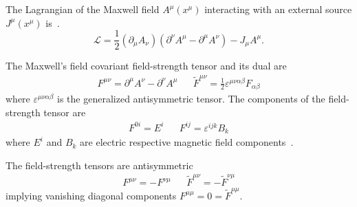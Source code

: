\begin{definition}
	The Lagrangian of the Maxwell field $A^\mu(x^\mu)$ interacting with an external source $J^\mu(x^\mu)$ is~\cite[p.~339]{Srednicki2007}.
	\begin{equation}
		\mathcal{L}
		=
		\frac{1}{2}
		(\partial_\mu A_\nu)
		\left(
			\partial^\nu A^\mu
			-
			\partial^\mu A^\nu
		\right)
		-
		J_\mu A^\mu
		\label{eq:mw_lagrangian}
		.
	\end{equation}
\end{definition}
\begin{definition}
	The Maxwell's field covariant field-strength tensor and its dual are
	\begin{align}
		F^{\mu\nu}
		=
		\partial^\mu A^\nu
		-
		\partial^\nu A^\mu
		&&
		\tilde{F}^{\mu\nu}
		=
		\frac{1}{2}
		\varepsilon^{\mu\nu\alpha\beta}
		F_{\alpha\beta}
		\label{eq:mw_field_strength_tensors}
	\end{align}
	where $\varepsilon^{\mu\nu\alpha\beta}$ is the generalized antisymmetric tensor.
	The components of the field-strength tensor are
	\begin{align}
		F^{0i}
		=
		E^i
		&&
		F^{ij}
		=
		\varepsilon^{ijk}B_k
		\label{eq:mw_field_strength_components}
	\end{align}
	where $E^i$ and $B_k$ are electric respective magnetic field components~\cite[p.~20]{Carroll1997}.
\end{definition}
\begin{corollary}
	The field-strength tensors are antisymmetric
	\begin{align}
		F^{\mu\nu}
		=
		-
		F^{\nu\mu}
		&&
		\tilde{F}^{\mu\nu}
		=
		-
		\tilde{F}^{\nu\mu}
	\end{align}
	implying vanishing diagonal components $F^{\mu\mu}=0=\tilde{F}^{\mu\mu}$.
\end{corollary}

